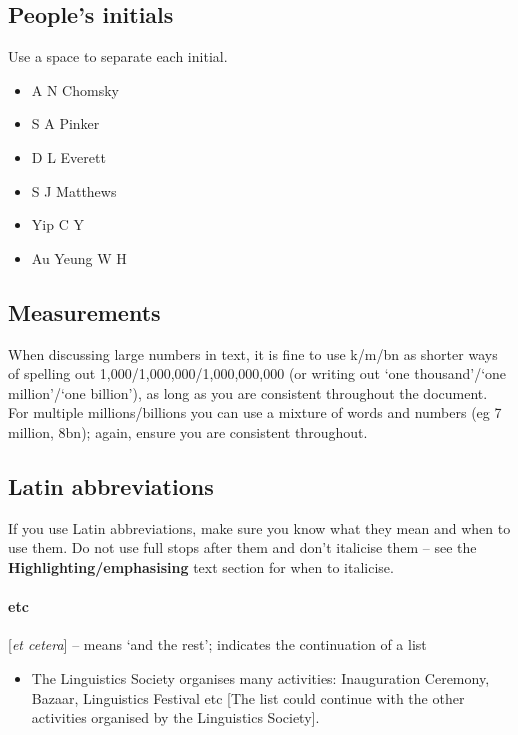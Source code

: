 \documentclass[11pt,a4paper]{book}
\newcommand{\cmark}{{\color{green(html/cssgreen)}\checkmark}}%
\begin{document}
		\subsection{People's initials}
		Use a space to separate each initial.
			{\firasans \begin{mdframed}[backgroundcolor=aliceblue] \begin{itemize}[label=\cmark]
				\item A N Chomsky
				\item S A Pinker
				\item D L Everett
				\item S J Matthews
				\item Yip C Y
				\item Au Yeung W H
			\end{itemize} \end{mdframed} }
		\subsection{Measurements}
		When discussing large numbers in text, it is fine to use k/m/bn as shorter ways of spelling out 1,000/1,000,000/1,000,000,000 (or writing out `one thousand'/`one million'/`one billion'), as long as you are consistent throughout the document. For multiple millions/billions you can use a mixture of words and numbers (eg 7 million, 8bn); again, ensure you are consistent throughout.
		\subsection{Latin abbreviations}
		If you use Latin abbreviations, make sure you know what they mean and when to use them. Do not use full stops after them and don't italicise them -- see the \textbf{Highlighting/emphasising} text section for when to italicise.
		\paragraph{etc} [\textit{et cetera}] -- means `and the rest'; indicates the continuation of a list
		{\firasans \begin{mdframed}[backgroundcolor=aliceblue] \begin{itemize}[label=\cmark]
			\item The Linguistics Society organises many activities: Inauguration Ceremony, Bazaar, Linguistics Festival etc [The list could continue with the other activities organised by the Linguistics Society].
		\end{itemize} \end{mdframed} }
		
\end{document}
